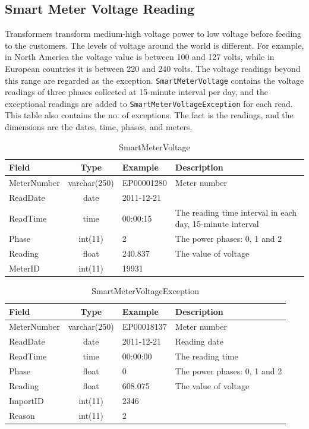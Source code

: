 \documentclass[a4paper,12pt]{llncs}
\begin{document}
\newpage

\subsection{Smart Meter Voltage Reading}
Transformers transform medium-high voltage power to low voltage  before feeding to the customers. The levels of voltage around the world is different. For example, in North America the voltage value is between 100 and 127 volts, while in European countries it is between 220 and 240 volts. The voltage readings beyond this range are regarded as the exception.   \texttt{SmartMeterVoltage} contains the voltage readings of three phases collected at 15-minute interval per day, and the exceptional readings are added to \texttt{SmartMeterVoltageException} for each read. This table also contains the no. of exceptions. The fact is the readings, and the dimensions are the dates, time, phases, and meters.

\begin{table}[htp]
\centering
\caption{SmartMeterVoltage}
\begin{tabular}{|l|c|l|p{9cm}|}
 \hline
 {\bf Field}       & {\bf Type} & {\bf Example}     & {\bf Description } \\ \hline
MeterNumber&varchar(250)& EP00001280& Meter number  \\ \hline
ReadDate   &date        &2011-12-21 &   \\ \hline
ReadTime   &time        &00:00:15 & The reading time interval in each day, 15-minute interval  \\ \hline
Phase      &int(11)     &2 & The power phases:  0, 1 and 2  \\ \hline
Reading    &float       &240.837 & The value of voltage  \\ \hline
MeterID    &int(11)     &19931 &   \\ \hline
\end{tabular}
\end{table}

\begin{table}[htp]
\centering
\caption{SmartMeterVoltageException}
\begin{tabular}{|l|c|l|p{9cm}|}
 \hline
 {\bf Field}       & {\bf Type} & {\bf Example}     & {\bf Description } \\ \hline
MeterNumber&varchar(250)& EP00018137&  Meter number \\ \hline
ReadDate   &date        &2011-12-21 & Reading date  \\ \hline
ReadTime   &time        &00:00:00 & The reading time  \\ \hline
Phase      &float       &0 & The power phases:  0, 1 and 2   \\ \hline
Reading    &float       &608.075 & The value of voltage  \\ \hline
ImportID   &int(11)     &2346 &   \\ \hline
Reason     &int(11)     &2 &   \\ \hline
\end{tabular}
\end{table}
\end{document}

